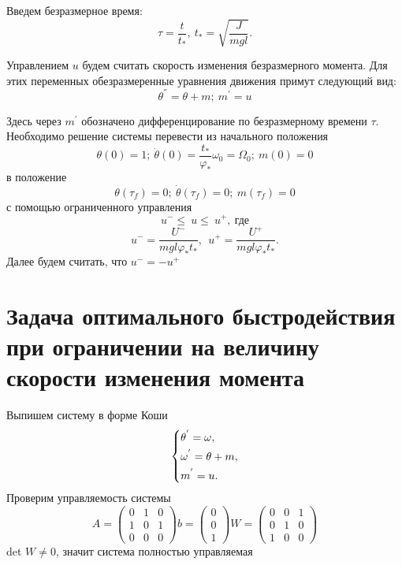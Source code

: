 \documentclass[a4paper,14pt]{article}
\theoremstyle{plain} %
\theoremstyle{definition} %
\theoremstyle{remark} %
\begin{document}
{Введем безразмерное время:
\[
    \tau=\frac{t}{t_\ast},\ t_\ast=\sqrt{\frac{J}{mgl}}.
\]

Управлением $u$ будем считать скорость изменения безразмерного
момента. Для этих переменных обезразмеренные уравнения движения
примут следующий вид:
\[
    \theta^{''}=\theta+m;\ m^{'}=u
\]

Здесь через $m^{'}$ обозначено дифференцирование по
безразмерному времени $\tau$. Необходимо решение системы
перевести из начального положения
\begin{equation}\label{9}
    \theta(0)=1;\ \dot{\theta}(0)=\frac{t_\ast}{\varphi_\ast}\omega_0=\Omega_0;\ m(0)=0
\end{equation}
в положение
\begin{equation}\label{9}
    \theta(\tau_f)=0;\ \dot{\theta}(\tau_f)=0;\ m(\tau_f)=0
\end{equation}
с помощью ограниченного управления
\[
    u^-\le\ u\le\ u^+,\ \text{где}
\]
\[
    u^-=\frac{U^-}{mgl\varphi_\ast t_\ast},\ \ u^+=\frac{U^+}{mgl\varphi_\ast t_\ast}.
\]
Далее будем считать, что $u^-=-u^+$
\newpage
\section{Задача оптимального быстродействия при ограничении на величину скорости изменения момента}
Выпишем систему в форме Коши
\begin{equation}\label{koshisystem}
    \left\{ {\begin{aligned}
                 & \theta^{'} = \omega , \hfill   \\
                 & \omega^{'} = \theta+m , \hfill \\
                 & m^{'} = u . \hfill             \\
            \end{aligned}} \right.
\end{equation}
Проверим управляемость системы
\begin{equation*}
    A =
    \begin{pmatrix}
        0 & 1 & 0 \\
        1 & 0 & 1 \\
        0 & 0 & 0
    \end{pmatrix}
    b =
    \begin{pmatrix}
        0 \\
        0 \\
        1
    \end{pmatrix}
    W =
    \begin{pmatrix}
        0 & 0 & 1 \\
        0 & 1 & 0 \\
        1 & 0 & 0
    \end{pmatrix}
\end{equation*}
det $W\neq0$, значит система полностью управляемая

}
\end{document}
